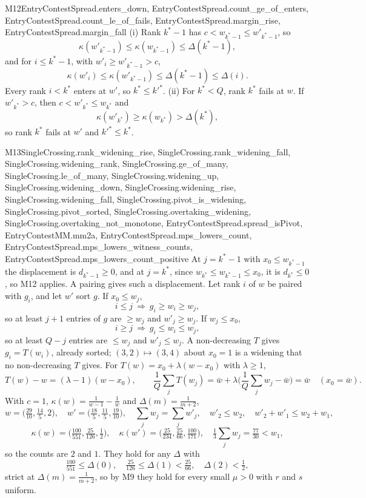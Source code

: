\begin{mproof}{M12}{EntryContestSpread.enters_down, EntryContestSpread.count_ge_of_enters, EntryContestSpread.count_le_of_fails, EntryContestSpread.margin_rise, EntryContestSpread.margin_fall}
(i) Rank $k^*-1$ has $c<w_{k^*-1}\le w'_{k^*-1}$, so
\[
  \kappa(w'_{k^*-1})\le\kappa(w_{k^*-1})\le\Delta(k^*-1),
\]
and for $i\le k^*-1$, with $w'_i\ge w'_{k^*-1}>c$,
\[
  \kappa(w'_i)\le\kappa(w'_{k^*-1})\le\Delta(k^*-1)\le\Delta(i).
\]
Every rank $i<k^*$ enters at $w'$, so $k^*\le k'^*$.
(ii) For $k^*<Q$, rank $k^*$ fails at $w$. If $w'_{k^*}>c$, then
$c<w'_{k^*}\le w_{k^*}$ and
\[
  \kappa(w'_{k^*})\ge\kappa(w_{k^*})>\Delta(k^*),
\]
so rank $k^*$ fails at $w'$ and $k'^*\le k^*$.
\end{mproof}

\begin{mproof}{M13}{SingleCrossing.rank_widening_rise, SingleCrossing.rank_widening_fall, SingleCrossing.widening_rank, SingleCrossing.ge_of_many, SingleCrossing.le_of_many, SingleCrossing.widening_up, SingleCrossing.widening_down, SingleCrossing.widening_rise, SingleCrossing.widening_fall, SingleCrossing.pivot_is_widening, SingleCrossing.pivot_sorted, SingleCrossing.overtaking_widening, SingleCrossing.overtaking_not_monotone, EntryContestSpread.spread_isPivot, EntryContestMM.mm2a, EntryContestSpread.mps_lowers_count, EntryContestSpread.mps_lowers_witness_counts, EntryContestSpread.mps_lowers_count_positive}
At $j=k^*-1$ with $x_0\le w_{k^*-1}$ the displacement is $d_{k^*-1}\ge0$, and at
$j=k^*$, since $w_{k^*}\le w_{k^*-1}\le x_0$, it is $d_{k^*}\le0$, so M12
applies. A pairing gives such a displacement. Let rank $i$ of $w$ be paired with
$g_i$, and let $w'$ sort $g$. If $x_0\le w_j$,
\[
  i\le j\ \Rightarrow\ g_i\ge w_i\ge w_j ,
\]
so at least $j+1$ entries of $g$ are $\ge w_j$ and $w'_j\ge w_j$. If $w_j\le x_0$,
\[
  i\ge j\ \Rightarrow\ g_i\le w_i\le w_j ,
\]
so at least $Q-j$ entries are $\le w_j$ and $w'_j\le w_j$. A non-decreasing $T$ gives
$g_i=T(w_i)$, already sorted; $(3,2)\mapsto(3,4)$ about $x_0=1$ is a widening
that no non-decreasing $T$ gives. For $T(w)=x_0+\lambda(w-x_0)$ with $\lambda\ge1$,
\[
  T(w)-w=(\lambda-1)(w-x_0),\qquad
  \frac1Q\sum_jT(w_j)=\bar w+\lambda\Big(\frac1Q\sum_jw_j-\bar w\Big)=\bar w
  \quad (x_0=\bar w).
\]
With $c=1$, $\kappa(w)=\frac1{w-1}-\frac1w$ and $\Delta(m)=\frac1{m+2}$,
\[
  w=\big(\tfrac{29}{10},\tfrac{14}5,2\big),\quad
  w'=\big(\tfrac{18}5,\tfrac{11}5,\tfrac{19}{10}\big),\quad
  \textstyle\sum_jw_j=\sum_jw'_j,\quad w'_2\le w_2,\quad w'_2+w'_1\le w_2+w_1,
\]
\[
  \kappa(w)=\big(\tfrac{100}{551},\tfrac{25}{126},\tfrac12\big),\quad
  \kappa(w')=\big(\tfrac{25}{234},\tfrac{25}{66},\tfrac{100}{171}\big),\quad
  \tfrac13\textstyle\sum_jw_j=\tfrac{77}{30}<w_1,
\]
so the counts are $2$ and $1$. They hold for any $\Delta$ with
\[
  \tfrac{100}{551}\le\Delta(0),\quad \tfrac{25}{126}\le\Delta(1)<\tfrac{25}{66},\quad
  \Delta(2)<\tfrac12,
\]
strict at $\Delta(m)=\frac1{m+2}$, so by M9 they hold for every small $\mu>0$ with
$r$ and $s$ uniform.
\end{mproof}

